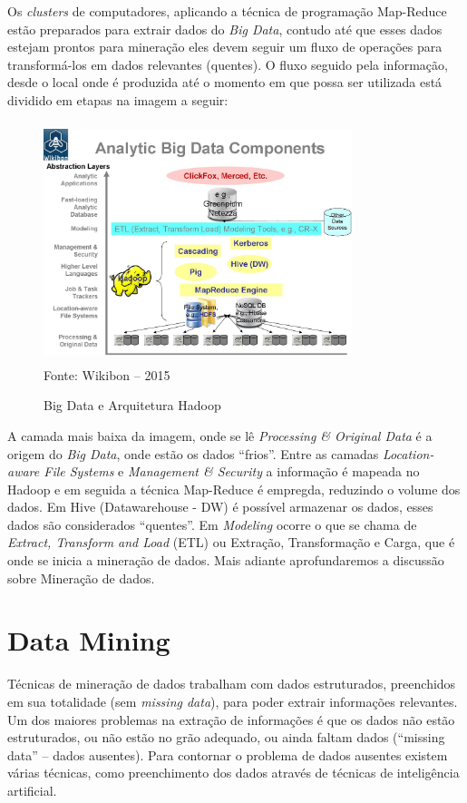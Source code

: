 Os \textit{clusters} de computadores, aplicando a técnica de programação Map-Reduce estão preparados para extrair dados do \textit{Big Data}, contudo até que esses dados 
estejam prontos para mineração eles devem seguir um fluxo de operações para transformá-los em dados relevantes (quentes).
O fluxo seguido pela informação, desde o local onde é produzida até o momento em que possa ser utilizada está dividido em etapas na imagem a seguir:

\begin{figure}[!ht]
\centering
\caption{Big Data e Arquitetura Hadoop}
\includegraphics[width=90mm, height=70mm]{Figuras/BigData/BigDataComponents.jpg}\\
\tiny Fonte: Wikibon -- 2015
\end{figure}

A camada mais baixa da imagem, onde se lê \textit{Processing \& Original Data} é a origem do \textit{Big Data}, onde estão os dados ``frios''. 
Entre as camadas \textit{Location-aware File Systems} e \textit{Management \& Security} a informação é mapeada no Hadoop e em seguida a técnica Map-Reduce é empregda, reduzindo
o volume dos dados. Em Hive (Datawarehouse - DW) é possível armazenar os dados, esses dados são considerados ``quentes''. Em \textit{Modeling} ocorre o que se chama de 
\textit{Extract, Transform and Load} (ETL) ou Extração, Transformação e Carga, que é onde se inicia a mineração de dados.
Mais adiante aprofundaremos a discussão sobre Mineração de dados.

\pagebreak


\section{Data Mining}

Técnicas de mineração de dados trabalham com dados estruturados, preenchidos em sua totalidade (sem \textit{missing data}), para poder extrair informações relevantes.
Um dos maiores problemas na extração de informações é que os dados não estão estruturados, ou não estão no grão adequado, ou ainda faltam dados (``missing data'' -- dados ausentes). 
Para contornar o problema de dados ausentes existem várias técnicas, como preenchimento dos dados através de técnicas de inteligência artificial.

